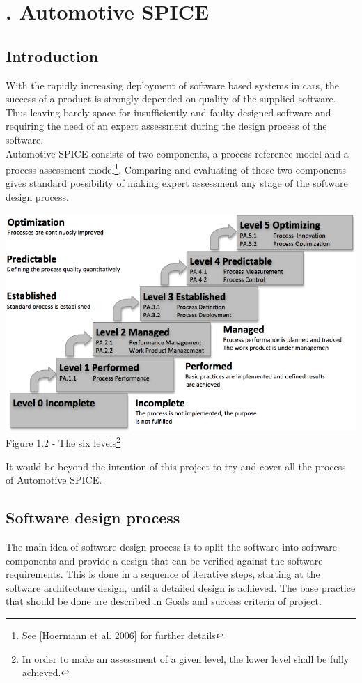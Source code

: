 \chapter[Automotive SPICE]{\thechapter. Automotive SPICE}
\section{Introduction}
With the rapidly increasing deployment of software based systems  in cars, the success of a product is strongly depended on quality of the supplied software. Thus leaving barely space for insufficiently and faulty designed software and requiring the need of an expert assessment during the design process of the software.\\
Automotive SPICE consists of two components, a process reference model and a process assessment model\footnote{See [Hoermann et al. 2006] for further details}. Comparing and evaluating of those two components gives standard possibility of making expert assessment any stage of the software design process.
\begin{center}
\includegraphics[scale=0.45]{Images/Automotive_Spice.png}\\
Figure 1.2 - The six levels\footnote{In order to make an assessment of a given level, the lower level shall be fully achieved. }
\end{center}
It would be beyond the intention of this project to try and cover all the process of Automotive SPICE.
\section{Software design process}
The main idea of software design process is to split the software into software components and provide a design that can be verified against the software requirements. This is done in a sequence of iterative steps, starting at the software architecture design,  until a detailed design is achieved.  The base practice that should be done are described in Goals and success criteria of project.